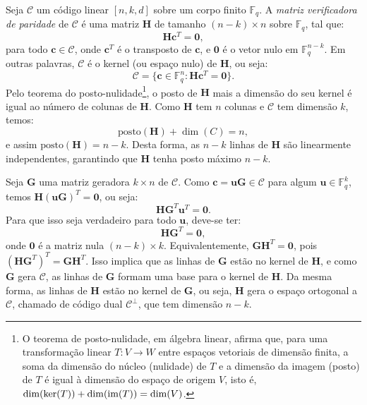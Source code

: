 \begin{definition}
Seja $\mathcal{C}$ um código linear $[n, k, d]$ sobre um corpo finito $\mathbb{F}_q$. 
A \emph{matriz verificadora de paridade} de $\mathcal{C}$ é uma matriz $\mathbf{H}$ de tamanho
$(n-k) \times n$ sobre $\mathbb{F}_q$, tal que:
\begin{equation}
\mathbf{H} \mathbf{c}^T = \mathbf{0},
\end{equation}
para todo $\mathbf{c} \in \mathcal{C}$, onde $\mathbf{c}^T$ é o transposto de $\mathbf{c}$, 
e $\mathbf{0}$ é o vetor nulo em $\mathbb{F}_q^{n-k}$. 
Em outras palavras, $\mathcal{C}$ é o kernel (ou espaço nulo) de $\mathbf{H}$, ou seja:
\begin{equation}
\mathcal{C} = \{ \mathbf{c} \in \mathbb{F}_q^n : \mathbf{H} \mathbf{c}^T = \mathbf{0} \}.
\end{equation}
Pelo teorema do posto-nulidade\footnote{O teorema de posto-nulidade, em álgebra linear, afirma que, para uma transformação linear $T: V \to W$ entre espaços vetoriais de dimensão finita, a soma da dimensão do núcleo (nulidade) de $T$ e a dimensão da imagem (posto) de $T$ é igual à dimensão do espaço de origem $V$, isto é, $\dim(\ker(T)) + \dim(\operatorname{im}(T)) = \dim(V)$.}, o posto de $\mathbf{H}$ mais a dimensão do seu kernel 
é igual ao número de colunas de $\mathbf{H}$. Como $\mathbf{H}$ tem $n$ colunas e $\mathcal{C}$ 
tem dimensão $k$, temos:
\begin{equation}
\text{posto}(\mathbf{H}) + \dim(C) = n, %
\end{equation}
e assim $\text{posto}(\mathbf{H}) = n - k$.
Desta forma, as $n-k$ linhas de $\mathbf{H}$ são linearmente independentes, garantindo que $\mathbf{H}$ tenha posto máximo $n-k$.

Seja $\mathbf{G}$ uma matriz geradora $k \times n$ de $\mathcal{C}$. 
Como $\mathbf{c} = \mathbf{u} \mathbf{G} \in \mathcal{C}$ para algum $\mathbf{u} \in \mathbb{F}_q^k$, 
temos $\mathbf{H} (\mathbf{u} \mathbf{G})^T = \mathbf{0}$, ou seja:
\begin{equation}
\mathbf{H} \mathbf{G}^T \mathbf{u}^T = \mathbf{0}.
\end{equation}
Para que isso seja verdadeiro para todo $\mathbf{u}$, deve-se ter:
\begin{equation}
\mathbf{H} \mathbf{G}^T = \mathbf{0},
\end{equation}
onde $\mathbf{0}$ é a matriz nula $(n-k) \times k$. 
Equivalentemente, $\mathbf{G} \mathbf{H}^T = \mathbf{0}$, 
pois $(\mathbf{H} \mathbf{G}^T)^T = \mathbf{G} \mathbf{H}^T$. 
Isso implica que as linhas de $\mathbf{G}$ estão no kernel de $\mathbf{H}$, 
e como $\mathbf{G}$ gera $\mathcal{C}$, as linhas de $\mathbf{G}$ formam uma base para 
o kernel de $\mathbf{H}$. Da mesma forma, as linhas de $\mathbf{H}$ estão no kernel 
de $\mathbf{G}$, ou seja, $\mathbf{H}$ gera o espaço ortogonal a $\mathcal{C}$, 
chamado de código dual $\mathcal{C}^\perp$, que tem dimensão $n-k$.


\end{definition}
